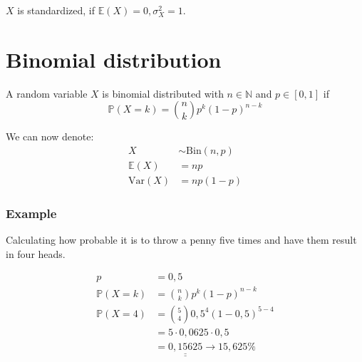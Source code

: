 \documentclass[twoside, a4paper, twocolumn]{article}
\begin{document}
    $X$ is standardized, if $\mathbb{E}(X) = 0, \sigma_X^2 = 1$.
    \section{Binomial distribution}

    A random variable $X$ is binomial distributed with $n \in \mathbb{N}$ and
    $p \in [0,1]$ if
    \begin{equation}
        \mathbb{P}(X = k) = \binom{n}{k}p^k(1-p)^{n-k}
    \end{equation}

    We can now denote:
    \begin{align}
        X &\sim \textrm{Bin}(n,p) \\
        \mathbb{E}(X) &= np \\
        \textrm{Var}(X) &= np(1-p)
    \end{align}

    \subsubsection{Example}
    Calculating how probable it is to throw a penny five times and have them
    result in four heads.

    \begin{align*}
        p &= 0,5 \\
        \mathbb{P}(X = k) &= \binom{n}{k}p^k(1-p)^{n-k} \\
        \mathbb{P}(X = 4) &= \binom{5}{4}0,5^4(1-0,5)^{5-4} \\
                          &= 5 \cdot 0,0625 \cdot 0,5 \\
                          &= \underline{\underline{0,15625}} \rightarrow 15,625\%
    \end{align*}


\end{document}
